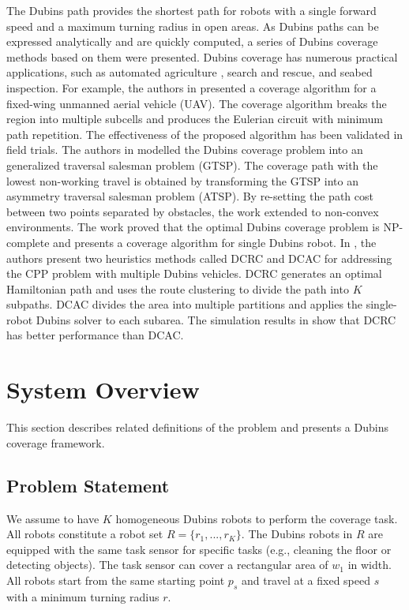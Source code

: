 \documentclass[journal,article,submit,pdftex,moreauthors]{Definitions/mdpi}
\begin{document}

The Dubins path \cite{dubins1957curves} provides the shortest path for robots with a single forward speed and a maximum turning radius in open areas. As Dubins paths can be expressed analytically and are quickly computed, a series of Dubins coverage methods based on them were presented. Dubins coverage has numerous practical applications, such as automated agriculture \cite{c12}, search and rescue, and seabed inspection. For example, the authors in \cite{xu2011optimal} presented a coverage algorithm for a fixed-wing unmanned aerial vehicle (UAV). The coverage algorithm breaks the region into multiple subcells and produces the Eulerian circuit with minimum path repetition. The effectiveness of the proposed algorithm \cite{xu2011optimal} has been validated in field trials. The authors in \cite{yu2015optimization} modelled the Dubins coverage problem into an generalized traversal salesman problem (GTSP). The coverage path with the lowest non-working travel is obtained by transforming the GTSP into an asymmetry traversal salesman problem (ATSP). By re-setting the path cost between two points separated by obstacles, the work \cite{yu2015optimization1} extended \cite{yu2015optimization} to non-convex environments. The work \cite{lewis2017semi} proved that the optimal Dubins coverage problem is NP-complete and presents a coverage algorithm for single Dubins robot. In \cite{karapetyan2018multi}, the authors present two heuristics methods called DCRC and DCAC for addressing the CPP problem with multiple Dubins vehicles. DCRC generates an optimal Hamiltonian path and uses the route clustering to divide the path into $K$ subpaths. DCAC divides the area into multiple partitions and applies the single-robot Dubins solver \cite{lewis2017semi} to each subarea. The simulation results in \cite{karapetyan2018multi} show that DCRC has better performance than DCAC.

\section{System Overview}
\label{Sec_Problem_Statement}

This section describes related definitions of the  problem and presents a Dubins coverage framework.

\subsection{Problem Statement}
\label{subsec_Problem_Statement}
We assume to have $K$ homogeneous Dubins robots to perform the coverage task. All robots constitute a robot set $R = \{r_1,...,r_K\}$. The Dubins robots in $R$ are equipped with the same task sensor for specific tasks (e.g., cleaning the floor or detecting objects). The task sensor can cover a rectangular area of $w_1$ in width. All robots start from the same starting point $p_s$ and travel at a fixed speed $s$ with a minimum turning radius $r$.
\end{document}
